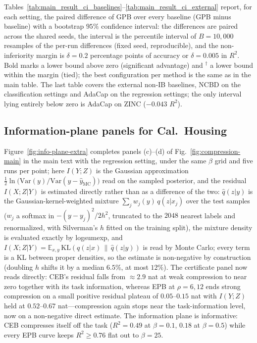 Tables~\ref{tab:main_result_ci_baselines}--\ref{tab:main_result_ci_external}
report, for each setting, the paired difference of GPB over every baseline
(GPB minus baseline) with a bootstrap $95\%$ confidence interval: the differences
are paired across the shared seeds, the interval is the percentile interval of
$B = 10{,}000$ resamples of the per-run differences (fixed seed, reproducible), and
the non-inferiority margin is $\delta = 0.2$ percentage points of accuracy or
$\delta = 0.005$ in $R^2$. Bold marks a lower bound above zero (significant
advantage) and $^{\dagger}$ a lower bound within the margin (tied); the best
configuration per method is the same as in the main table. The last table covers
the external non-IB baselines, NCBD on the classification settings and AdaCap on
the regression settings; the only interval lying entirely below zero is AdaCap on
ZINC ($-0.043$ $R^2$).



\subsection{Information-plane panels for Cal.~Housing}
\label{app:info-plane-extra}

Figure~\ref{fig:info-plane-extra} completes panels (c)--(d) of
Fig.~\ref{fig:compression-main} in the main text with the regression setting, under
the same $\beta$ grid and five runs per point; here
$I(Y;Z)$ is the Gaussian approximation
$\tfrac12 \ln\bigl(\mathrm{Var}(y)/\mathrm{Var}(y-\hat y_{\mathrm{MC}})\bigr)$
read on the sampled posterior, and the residual $I(X;Z|Y)$ is estimated directly
rather than as a difference of the two: $\hat q(z|y)$ is the
Gaussian-kernel-weighted mixture $\sum_j w_j(y)\,q(z|x_j)$ over the test samples
($w_j$ a softmax in $-(y-y_j)^2/2h^2$, truncated to the $2048$ nearest labels and
renormalized, with Silverman's $h$ fitted on the training split), the mixture
density is evaluated exactly by logsumexp, and
$I(X;Z|Y)=\mathbb{E}_{x,y}\,\mathrm{KL}(q(z|x)\,\|\,\hat q(z|y))$ is read by Monte
Carlo; every term is a KL between proper densities, so the estimate is
non-negative by construction (doubling $h$ shifts it by a median $6.5\%$, at most
$12\%$). The certificate panel now reads directly: CEB's residual falls from
$\approx 2.9$ nat at weak compression to near zero together with its task
information, whereas EPB at $\rho=6,12$ ends strong compression on a small
positive residual plateau of $0.05$--$0.15$ nat with $I(Y;Z)$ held at
$0.52$--$0.67$ nat---compression again stops near the task-information level, now
on a non-negative direct estimate. The information plane is informative: CEB
compresses itself off the task ($R^2 = 0.49$ at $\beta = 0.1$, $0.18$ at
$\beta = 0.5$) while every EPB curve keeps $R^2 \ge 0.76$ flat out to
$\beta = 25$.

